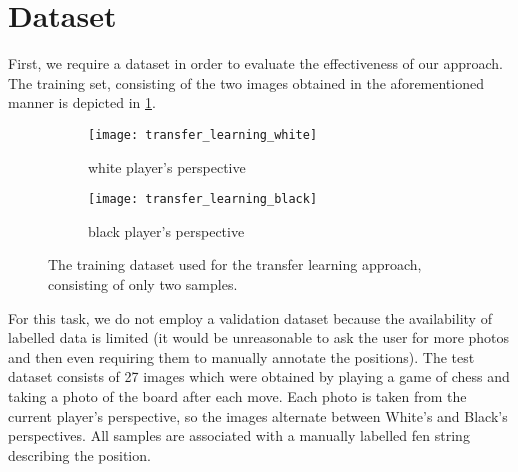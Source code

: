 \documentclass[../main.tex]{subfiles}
\begin{document}
\section{Dataset}
First, we require a dataset in order to evaluate the effectiveness of our approach.
The training set, consisting of the two images obtained in the aforementioned manner is depicted in \cref{fig:transfer_learning_train_data}.
\begin{figure}
    \centering
    \begin{subfigure}[b]{0.47\textwidth}
        \centering
        \texttt{[image: transfer\_learning\_white]}
        \caption{white player's perspective}
    \end{subfigure}
    \hfill
    \begin{subfigure}[b]{0.47\textwidth}
        \centering
        \texttt{[image: transfer\_learning\_black]}
        \caption{black player's perspective}
    \end{subfigure}
    \caption{The training dataset used for the transfer learning approach, consisting of only two samples.}
    \label{fig:transfer_learning_train_data}
\end{figure}
For this task, we do not employ a validation dataset because the availability of labelled data is limited (it would be unreasonable to ask the user for more photos and then even requiring them to manually annotate the positions).
The test dataset consists of 27 images which were obtained by playing a game of chess and taking a photo of the board after each move.
Each photo is taken from the current player's perspective, so the images alternate between White's and Black's perspectives.
All samples are associated with a manually labelled \gls{fen} string describing the position.
\end{document}
